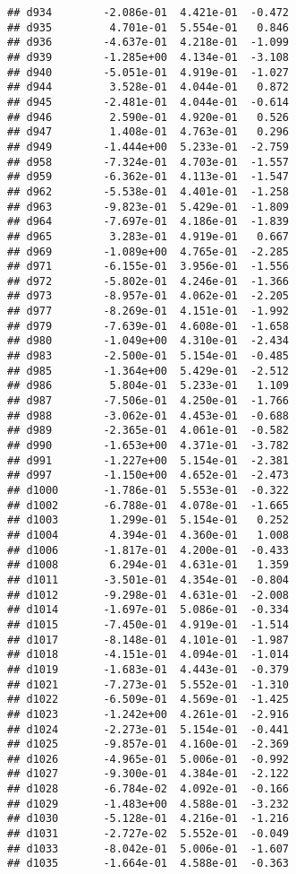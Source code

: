 \documentclass[
]{article}
\begin{document}
\begin{verbatim}
## d934        -2.086e-01  4.421e-01  -0.472
## d935         4.701e-01  5.554e-01   0.846
## d936        -4.637e-01  4.218e-01  -1.099
## d939        -1.285e+00  4.134e-01  -3.108
## d940        -5.051e-01  4.919e-01  -1.027
## d944         3.528e-01  4.044e-01   0.872
## d945        -2.481e-01  4.044e-01  -0.614
## d946         2.590e-01  4.920e-01   0.526
## d947         1.408e-01  4.763e-01   0.296
## d949        -1.444e+00  5.233e-01  -2.759
## d958        -7.324e-01  4.703e-01  -1.557
## d959        -6.362e-01  4.113e-01  -1.547
## d962        -5.538e-01  4.401e-01  -1.258
## d963        -9.823e-01  5.429e-01  -1.809
## d964        -7.697e-01  4.186e-01  -1.839
## d965         3.283e-01  4.919e-01   0.667
## d969        -1.089e+00  4.765e-01  -2.285
## d971        -6.155e-01  3.956e-01  -1.556
## d972        -5.802e-01  4.246e-01  -1.366
## d973        -8.957e-01  4.062e-01  -2.205
## d977        -8.269e-01  4.151e-01  -1.992
## d979        -7.639e-01  4.608e-01  -1.658
## d980        -1.049e+00  4.310e-01  -2.434
## d983        -2.500e-01  5.154e-01  -0.485
## d985        -1.364e+00  5.429e-01  -2.512
## d986         5.804e-01  5.233e-01   1.109
## d987        -7.506e-01  4.250e-01  -1.766
## d988        -3.062e-01  4.453e-01  -0.688
## d989        -2.365e-01  4.061e-01  -0.582
## d990        -1.653e+00  4.371e-01  -3.782
## d991        -1.227e+00  5.154e-01  -2.381
## d997        -1.150e+00  4.652e-01  -2.473
## d1000       -1.786e-01  5.553e-01  -0.322
## d1002       -6.788e-01  4.078e-01  -1.665
## d1003        1.299e-01  5.154e-01   0.252
## d1004        4.394e-01  4.360e-01   1.008
## d1006       -1.817e-01  4.200e-01  -0.433
## d1008        6.294e-01  4.631e-01   1.359
## d1011       -3.501e-01  4.354e-01  -0.804
## d1012       -9.298e-01  4.631e-01  -2.008
## d1014       -1.697e-01  5.086e-01  -0.334
## d1015       -7.450e-01  4.919e-01  -1.514
## d1017       -8.148e-01  4.101e-01  -1.987
## d1018       -4.151e-01  4.094e-01  -1.014
## d1019       -1.683e-01  4.443e-01  -0.379
## d1021       -7.273e-01  5.552e-01  -1.310
## d1022       -6.509e-01  4.569e-01  -1.425
## d1023       -1.242e+00  4.261e-01  -2.916
## d1024       -2.273e-01  5.154e-01  -0.441
## d1025       -9.857e-01  4.160e-01  -2.369
## d1026       -4.965e-01  5.006e-01  -0.992
## d1027       -9.300e-01  4.384e-01  -2.122
## d1028       -6.784e-02  4.092e-01  -0.166
## d1029       -1.483e+00  4.588e-01  -3.232
## d1030       -5.128e-01  4.216e-01  -1.216
## d1031       -2.727e-02  5.552e-01  -0.049
## d1033       -8.042e-01  5.006e-01  -1.607
## d1035       -1.664e-01  4.588e-01  -0.363

\end{verbatim}
\end{document}
